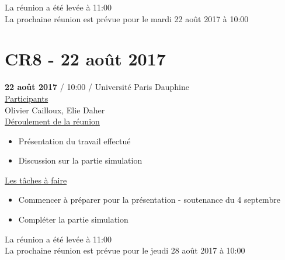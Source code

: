 \documentclass{report}
\begin{document}
\begin{appendices}
La réunion a été levée à 11:00\\

La prochaine réunion est prévue pour le mardi 22 août 2017 à 10:00
\newpage
\section{CR8 - 22 août 2017}
\textbf{22 août 2017} / 10:00 / Université Paris Dauphine \\

\underline{Participants} \\

Olivier Cailloux, Elie Daher\\

\underline{Déroulement de la réunion} \\
\begin{itemize}
	\item Présentation du travail effectué
	\item Discussion sur la partie simulation\\
\end{itemize}

\underline{Les tâches à faire} \\
\begin{itemize}
	\item Commencer à préparer pour la présentation - soutenance du 4 septembre
	\item Compléter la partie simulation\\
\end{itemize}

La réunion a été levée à 11:00\\

La prochaine réunion est prévue pour le jeudi 28 août 2017 à 10:00



\end{appendices}
\end{document}
